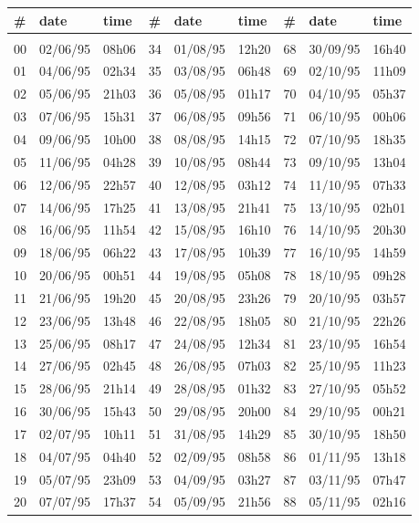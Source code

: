 \documentclass{tufte-handout}
\begin{document}
\begin{table}
\begin{tabular}{lll|lll|lll}
\# & date & time & \# & date & time & \# & date & time \\ \hline\\
00 & 02/06/95 & 08h06 & 34 & 01/08/95 & 12h20 & 68 & 30/09/95 & 16h40\\
01 & 04/06/95 & 02h34 & 35 & 03/08/95 & 06h48 & 69 & 02/10/95 & 11h09\\
02 & 05/06/95 & 21h03 & 36 & 05/08/95 & 01h17 & 70 & 04/10/95 & 05h37\\
03 & 07/06/95 & 15h31 & 37 & 06/08/95 & 09h56 & 71 & 06/10/95 & 00h06\\
04 & 09/06/95 & 10h00 & 38 & 08/08/95 & 14h15 & 72 & 07/10/95 & 18h35\\
05 & 11/06/95 & 04h28 & 39 & 10/08/95 & 08h44 & 73 & 09/10/95 & 13h04\\
06 & 12/06/95 & 22h57 & 40 & 12/08/95 & 03h12 & 74 & 11/10/95 & 07h33\\
07 & 14/06/95 & 17h25 & 41 & 13/08/95 & 21h41 & 75 & 13/10/95 & 02h01\\
08 & 16/06/95 & 11h54 & 42 & 15/08/95 & 16h10 & 76 & 14/10/95 & 20h30\\
09 & 18/06/95 & 06h22 & 43 & 17/08/95 & 10h39 & 77 & 16/10/95 & 14h59\\
10 & 20/06/95 & 00h51 & 44 & 19/08/95 & 05h08 & 78 & 18/10/95 & 09h28\\
11 & 21/06/95 & 19h20 & 45 & 20/08/95 & 23h26 & 79 & 20/10/95 & 03h57\\
12 & 23/06/95 & 13h48 & 46 & 22/08/95 & 18h05 & 80 & 21/10/95 & 22h26\\
13 & 25/06/95 & 08h17 & 47 & 24/08/95 & 12h34 & 81 & 23/10/95 & 16h54\\
14 & 27/06/95 & 02h45 & 48 & 26/08/95 & 07h03 & 82 & 25/10/95 & 11h23\\
15 & 28/06/95 & 21h14 & 49 & 28/08/95 & 01h32 & 83 & 27/10/95 & 05h52\\
16 & 30/06/95 & 15h43 & 50 & 29/08/95 & 20h00 & 84 & 29/10/95 & 00h21\\
17 & 02/07/95 & 10h11 & 51 & 31/08/95 & 14h29 & 85 & 30/10/95 & 18h50\\
18 & 04/07/95 & 04h40 & 52 & 02/09/95 & 08h58 & 86 & 01/11/95 & 13h18\\
19 & 05/07/95 & 23h09 & 53 & 04/09/95 & 03h27 & 87 & 03/11/95 & 07h47\\
20 & 07/07/95 & 17h37 & 54 & 05/09/95 & 21h56 & 88 & 05/11/95 & 02h16\\

\end{tabular}
\end{table}
\end{document}
